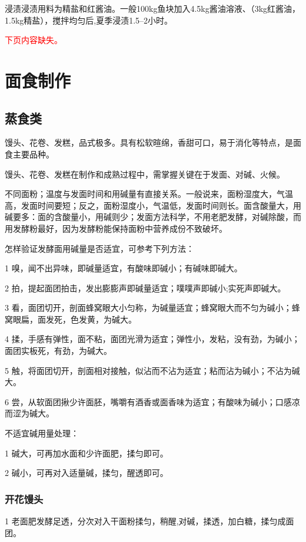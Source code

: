 \documentclass{ctexbook}
\begin{document}
浸渍浸渍用料为精盐和红酱油。一般100kg鱼块加入4.5kg酱油溶液、（3kg红酱油，1.5kg精盐），搅拌均匀后,夏季浸渍1.5--2小时。

\textcolor{red}{下页内容缺失。}






\chapter{面食制作}
\section{蒸食类}
馒头、花卷、发糕，品式极多。具有松软暄绵，香甜可口，易于消化等特点，是面食主要品种。

馒头、花卷、发糕在制作和成熟过程中，需掌握关键在于发面、对碱、火候。

不同面粉；温度与发面时间和用碱量有直接关系。一般说来，面粉湿度大，气温高，发面时间要短；反之，面粉湿度小，气温低，发面时间则长。面含酸量大，用碱要多：面的含酸量小，用碱则少；发面方法科学，不用老肥发酵，对碱除酸，而用发酵粉最好，因为发酵粉能保持面粉中营养成份不致破坏。

怎样验证发酵面用碱量是否适宜，可参考下列方法：

1 嗅，闻不出异味，即碱量适宜，有酸味即碱小；有碱味即碱大。

2 拍，提起面团拍击，发出膨膨声即碱量适宜；噗噗声即碱小;实死声即碱大。

3 看，面团切开，剖面蜂窝眼大小匀称，为碱量适宜；蜂窝眼大而不匀为碱小；蜂窝眼扁，面发死，色发黄，为碱大。

4 揉，手感有弹性，面不粘，面团光滑为适宜；弹性小，发粘，没有劲，为碱小；面团实板死，有劲，为碱大。

5 触，将面团切开，剖面相对接触，似沾而不沾为适宜；粘而沾为碱小；不沾为碱大。

6 尝，从软面团揪少许面胚，嘴嚼有酒香或面香味为适宜；有酸味为碱小；口感凉而涩为碱大。

不适宜碱用量处理：

1 碱大，可再加水面和少许面肥，揉匀即可。

2 碱小，可再对入适量碱，揉匀，醒透即可。

\subsection{开花馒头}

1 老面肥发酵足透，分次对入干面粉揉匀，稍醒,对碱，揉透，加白糖，揉匀成面团。
\end{document}
